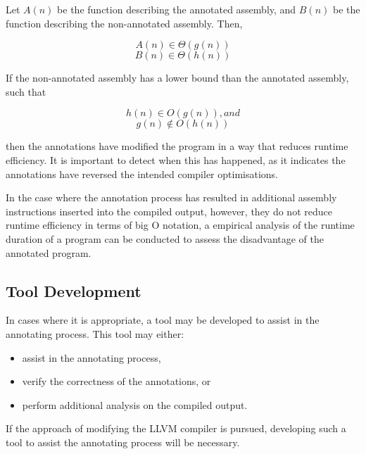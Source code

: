 Let \(A(n)\) be the function describing the annotated assembly, and \(B(n)\) be the function describing the non-annotated assembly. Then,

\[A(n) \in \Theta(g(n))\]
\[B(n) \in \Theta(h(n))\]

If the non-annotated assembly has a lower bound than the annotated assembly, such that

\[h(n) \in O(g(n)), and\]
\[g(n) \notin O(h(n))\]

then the annotations have modified the program in a way that reduces runtime efficiency. It is important to detect when this has happened, as it indicates the annotations have reversed the intended compiler optimisations.

In the case where the annotation process has resulted in additional assembly instructions inserted into the compiled output, however, they do not reduce runtime efficiency in terms of big O notation, a empirical analysis of the runtime duration of a program can be conducted to assess the disadvantage of the annotated program.

\subsection{Tool Development}
\label{subsec:toolDevelopment}
In cases where it is appropriate, a tool may be developed to assist in the annotating process. This tool may either:
\begin{itemize}
    \item assist in the annotating process,
    \item verify the correctness of the annotations, or
    \item perform additional analysis on the compiled output.
\end{itemize}
If the approach of modifying the LLVM compiler is pursued, developing such a tool to assist the annotating process will be necessary.